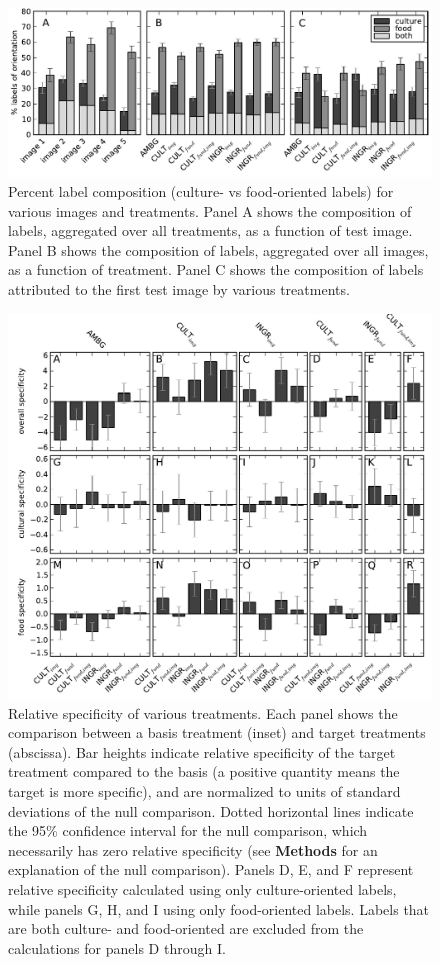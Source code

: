 \documentclass[a4paper]{report}
\begin{document}
\begin{figure}
	\includegraphics{figs/orientationVsTreatment_full.pdf}
	\caption{Percent label composition (culture- vs food-oriented labels) for 
		various images and treatments.  Panel A shows the composition of 
		labels, aggregated over all treatments, as a function of test image.
		Panel B shows the composition of labels, aggregated over all images, as
		a function of treatment.  Panel C shows the composition of labels 
		attributed to the first test image by various treatments.}
\end{figure}


\begin{figure}
	\includegraphics{figs/specificity-full-allImages.pdf}
	\caption{Relative specificity of various treatments.
		Each panel shows the comparison between a basis treatment (inset) and 
		target treatments (abscissa).
		Bar heights indicate relative specificity of the target 
		treatment compared to the basis (a positive quantity means the target 
		is more specific), and are normalized to units of standard 
		deviations of the null comparison.  Dotted horizontal lines indicate
		the 95\% confidence interval for the null comparison, which necessarily
		has zero relative specificity (see \textbf{Methods} 
		for an explanation of the null comparison).  Panels D, E, and F 
		represent relative specificity calculated using only culture-oriented
		labels, while panels G, H, and I using only food-oriented labels.
		Labels that are both culture- and food-oriented are excluded from the
		calculations for panels D through I.
		}
\end{figure}
\end{document}
